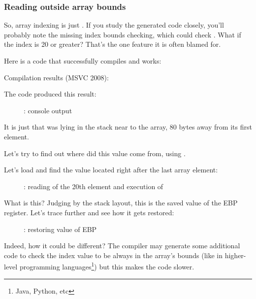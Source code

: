 \subsubsection{Reading outside array bounds}

So, array indexing is just .
If you study the generated code closely, you'll probably note the missing index bounds checking,
which could check .
What if the index is 20 or greater?
That's the one \CCpp feature it is often blamed for.

Here is a code that successfully compiles and works:



Compilation results (MSVC 2008):



The code produced this result:

\begin{figure}[h]
\centering
{}
\caption{\olly: console output}
\label{fig:array_BO_olly_r3}
\end{figure}

It is just  that was lying in the stack near to the array, 80 bytes away from its first element.

\clearpage
\myindex{\olly}
Let's try to find out where did this value come from, using \olly.

Let's load and find the value located right after the last array element:

\begin{figure}[H]
\centering
{}
\caption{\olly: reading of the 20th element and execution of \printf}
\label{fig:array_BO_olly_r1}
\end{figure}

What is this? 
Judging by the stack layout,
this is the saved value of the EBP register.
\clearpage
Let's trace further and see how it gets restored:

\begin{figure}[H]
\centering
{}
\caption{\olly: restoring value of EBP}
\label{fig:array_BO_olly_r2}
\end{figure}

Indeed, how it could be different?
The compiler may generate some additional code to check the index value to be always
in the array's bounds (like in higher-level programming languages\footnote{Java, Python, etc})
but this makes the code slower.

